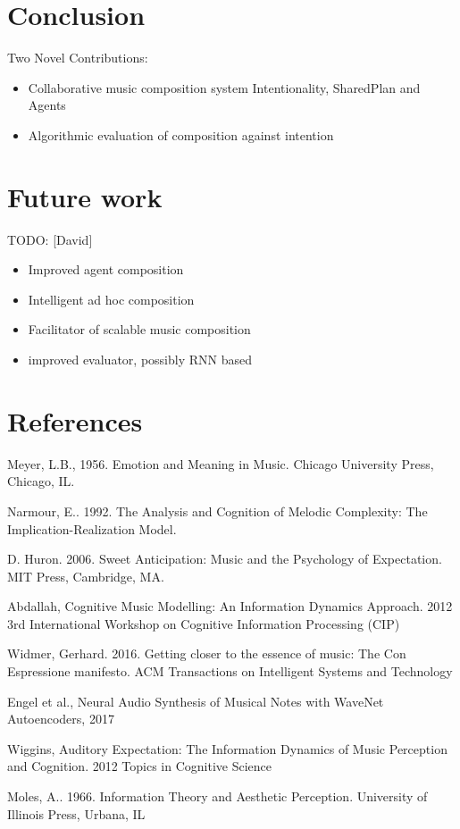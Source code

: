 \documentclass[final,authoryear,11pt,times]{elsarticle}
\begin{document}
\section{Conclusion}
 Two Novel Contributions:
 \begin{itemize}
\item Collaborative music composition system 
Intentionality, SharedPlan and Agents
\item Algorithmic evaluation of composition against intention
\end{itemize}

\section {Future work}
TODO: [David]

\begin{itemize}
\item Improved agent composition
\item Intelligent ad hoc composition
\item Facilitator of scalable music composition
\item improved evaluator, possibly RNN based
\end{itemize}

\section{References}
Meyer, L.B., 1956. Emotion and Meaning in Music. Chicago University Press, Chicago, IL.

Narmour, E.. 1992. The Analysis and Cognition of Melodic Complexity: The Implication-Realization Model.

D. Huron. 2006. Sweet Anticipation: Music and the Psychology of Expectation. MIT Press, Cambridge, MA.

Abdallah, Cognitive Music Modelling: An Information Dynamics Approach. 2012 3rd International Workshop on Cognitive Information Processing (CIP)

Widmer, Gerhard. 2016. Getting closer to the essence of music: The Con Espressione manifesto. ACM Transactions on Intelligent Systems and Technology

Engel et al., Neural Audio Synthesis of Musical Notes with WaveNet Autoencoders, 2017

Wiggins, Auditory Expectation: The Information Dynamics of Music Perception and Cognition. 2012 Topics in Cognitive Science

Moles, A.. 1966. Information Theory and Aesthetic Perception. University of Illinois Press, Urbana, IL
\end{document}

